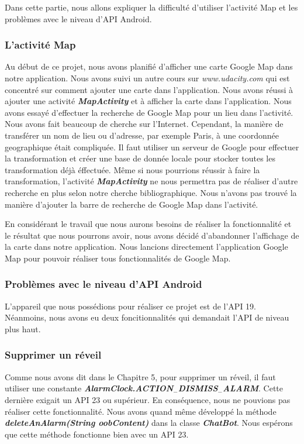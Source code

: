 \indent Dans cette partie, nous allons expliquer la difficulté d'utiliser l'activité Map et les problèmes avec le niveau d'API Android.

\subsubsection{L'activité Map}

\indent Au début de ce projet, nous avons planifié d'afficher une carte Google Map dans notre application. Nous avons suivi un autre cours sur \emph{www.udacity.com} qui est concentré sur comment ajouter une carte dans l'application. Nous avons réussi à ajouter une activité \textbf{\emph{MapActivity}} et à afficher la carte dans l'application. Nous avons essayé d'effectuer la recherche de Google Map pour un lieu dans l'activité. Nous avons fait beaucoup de cherche sur l'Internet. Cependant, la manière de transférer un nom de lieu ou d'adresse, par exemple Paris, à une coordonnée geographique était compliquée. Il faut utiliser un serveur de Google pour effectuer la transformation et créer une base de donnée locale pour stocker toutes les transformation déjà éffectuée. Même si nous pourrions réussir à faire la transformation, l'activité \textbf{\emph{MapActivity}} ne nous permettra pas de réaliser d'autre recherche en plus selon notre cherche bibliographique. Nous n'avons pas trouvé la manière d'ajouter la barre de recherche de Google Map dans l'activité.

\indent En considérant le travail que nous aurons besoins de réaliser la fonctionnalité et le résultat que nous pourrons avoir, nous avons décidé d'abandonner l'affichage de la carte dans notre application. Nous lancions directement l'application Google Map pour pouvoir réaliser tous fonctionnalités de Google Map.

\subsubsection{Problèmes avec le niveau d'API Android}

\indent L'appareil que nous possédions pour réaliser ce projet est de l'API 19. Néanmoins, nous avons eu deux foncitionnalités qui demandait l'API de niveau plus haut.

\subsubsection*{Supprimer un réveil}

\indent Comme nous avons dit dans le Chapitre 5, pour supprimer un réveil, il faut utiliser une constante \textbf{\emph{AlarmClock.ACTION$_-$DISMISS$_-$ALARM}}. Cette dernière exigait un API 23 ou supérieur. En conséquence, nous ne pouvions pas réaliser cette fonctionnalité. Nous avons quand même développé la méthode \textbf{\emph{deleteAnAlarm(String oobContent)}} dans la classe \textbf{\emph{ChatBot}}. Nous espérons que cette méthode fonctionne bien avec un API 23.


